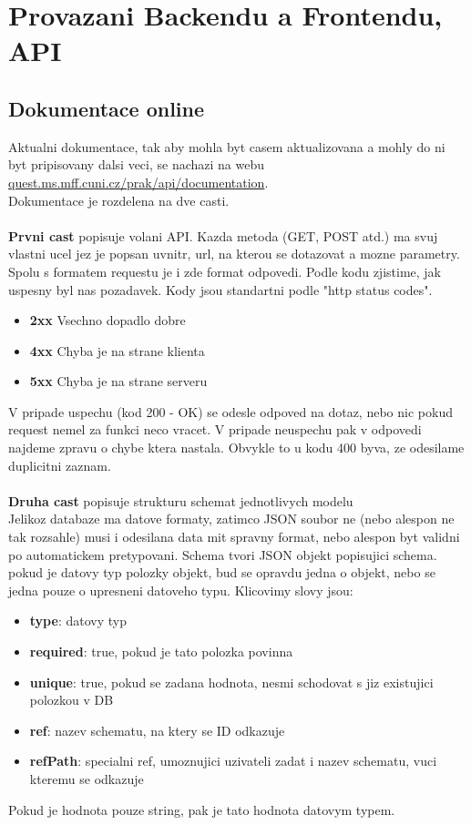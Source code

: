 \chapter{Provazani Backendu a Frontendu, API}

\section{Dokumentace online}
Aktualni dokumentace, tak aby mohla byt casem aktualizovana a mohly do ni
byt pripisovany dalsi veci, se nachazi na webu 
\href{http://quest.ms.mff.cuni.cz/prak/api/documentation}{quest.ms.mff.cuni.cz/prak/api/documentation}.
\\
Dokumentace je rozdelena na dve casti.
\\
\\
\textbf{Prvni cast} popisuje volani API. 
Kazda metoda (GET, POST atd.) ma svuj vlastni ucel
jez je popsan uvnitr, url, na kterou se dotazovat a mozne parametry.
Spolu s formatem requestu je i zde format odpovedi.
Podle kodu zjistime, jak uspesny byl nas pozadavek.
Kody jsou standartni podle "http status codes".
\begin{itemize}
	\item \textbf{2xx} Vsechno dopadlo dobre
	\item \textbf{4xx} Chyba je na strane klienta
	\item \textbf{5xx} Chyba je na strane serveru
\end{itemize}
V pripade uspechu (kod 200 - OK) se odesle odpoved na dotaz, nebo
nic pokud request nemel za funkci neco vracet. 
V pripade neuspechu pak v odpovedi najdeme zpravu o chybe ktera nastala.
Obvykle to u kodu 400 byva, ze odesilame duplicitni zaznam.
\\
\\
\textbf{Druha cast} popisuje strukturu schemat jednotlivych modelu\\
Jelikoz databaze ma datove formaty, zatimco JSON soubor ne (nebo alespon ne tak rozsahle)
musi i odesilana data mit spravny format, nebo alespon byt validni po automatickem
pretypovani.
Schema tvori JSON objekt popisujici schema.
pokud je datovy typ polozky objekt, bud se opravdu jedna o objekt, nebo
se jedna pouze o upresneni datoveho typu.
Klicovimy slovy jsou:
\begin{itemize}
	\item \textbf{type}: datovy typ
	\item \textbf{required}: true, pokud je tato polozka povinna
	\item \textbf{unique}: true, pokud se zadana hodnota, nesmi schodovat s jiz existujici polozkou v DB
	\item \textbf{ref}: nazev schematu, na ktery se ID odkazuje
	\item \textbf{refPath}: specialni ref, umoznujici uzivateli zadat i nazev schematu, vuci kteremu se odkazuje
\end{itemize}
Pokud je hodnota pouze string, pak je tato hodnota datovym typem.

